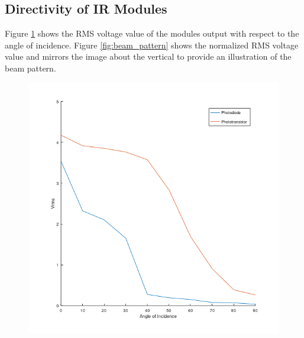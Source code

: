 \subsection{Directivity of IR Modules}

Figure \ref{fig:vrms_vs_angle_of_incidence} shows the RMS voltage value of the modules output with respect to the angle of incidence. Figure \ref{fig:beam_pattern} shows the normalized RMS voltage value and mirrors the image about the vertical to provide an illustration of the beam pattern.


\begin{figure}[H]
	\centering
	\begin{minipage}{.4\linewidth}
		\centering
		\includegraphics[width=\textwidth]{figures/results/vrms_vs_incidence_square.png}
		\label{fig:vrms_vs_angle_of_incidence}
	\end{minipage}
	\hspace{.1\linewidth}
	\begin{minipage}{.4\linewidth}
		\centering

\end{minipage}
\end{figure}
